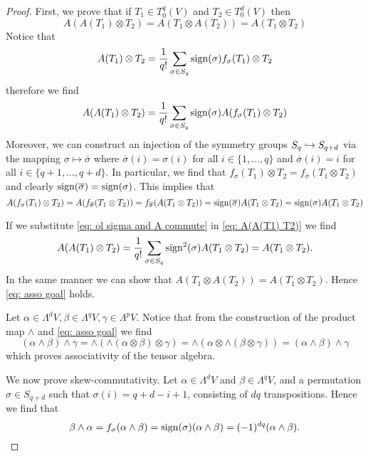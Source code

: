 \begin{proof}
  First, we prove that if \(T_1 \in T_0^q(V)\) and \(T_2 \in T_0^d(V)\) then
  \begin{equation}\label{eq: asso goal}
    A(A(T_1) \otimes T_2) = A(T_1 \otimes A(T_2)) =
    A(T_1 \otimes T_2)
  \end{equation} Notice that \[
    A(T_1) \otimes T_2 = \frac 1 {q!} \sum_{\sigma \in S_q}
    \operatorname{sign}(\sigma) f_\sigma(T_1) \otimes T_2
  \]
  therefore we find
  \begin{equation}\label{eq: A(A(T1) T2)}
    A(A(T_1) \otimes T_2) = \frac 1 {q!} \sum_{\sigma \in S_q}
    \operatorname{sign}(\sigma) A(f_\sigma(T_1) \otimes T_2)
  \end{equation}
  Moreover, we can construct an injection of the symmetry groups \(S_q
  \hookrightarrow S_{q + d}\) via the mapping \(\sigma \mapsto \overline \sigma\)
  where \(\overline \sigma(i) = \sigma(i)\) for all \(i \in \{1, \dots, q\}\)
  and \(\overline \sigma(i) = i\) for all \(i \in \{q + 1, \dots, q + d\}\). In
  particular, we find that \(f_\sigma(T_1) \otimes T_2 = f_{\overline \sigma}
  (T_1 \otimes T_2)\) and clearly \(\operatorname{sign}(\overline \sigma) = \operatorname{sign}(\sigma)\).
  This implies that
  \begin{equation}\label{eq: ol sigma and A commute}
    A(f_\sigma(T_1) \otimes T_2) = A(f_{\overline \sigma}(T_1 \otimes T_2))
    = f_{\overline \sigma}(A(T_1 \otimes T_2))
    = \operatorname{sign}(\overline \sigma) A(T_1 \otimes T_2)
    = \operatorname{sign}(\sigma) A(T_1 \otimes T_2)
  \end{equation}

  If we substitute \cref{eq: ol sigma and A commute} in \cref{eq: A(A(T1) T2)}
  we find
  \[
    A(A(T_1) \otimes T_2) = \frac 1 {q!} \sum_{\sigma \in S_q}
    \operatorname{sign}^2(\sigma) A(T_1 \otimes T_2) = A(T_1 \otimes T_2).
  \]
  In the same manner we can show that \(A(T_1 \otimes A(T_2)) = A(T_1 \otimes
  T_2)\). Hence \cref{eq: asso goal} holds.

  Let \(\alpha \in \Lambda^d V, \beta \in \Lambda^q V, \gamma \in \Lambda^p V\).
  Notice that from the construction of the product map \(\wedge\) and \cref{eq:
  asso goal} we find
  \[
    (\alpha \wedge \beta) \wedge \gamma
    = \wedge\left( \wedge(\alpha \otimes \beta) \otimes \gamma \right)
    = \wedge\left(\alpha \otimes \wedge(\beta \otimes \gamma) \right)
    = (\alpha \wedge \beta) \wedge \gamma
  \]
  which proves associativity of the tensor algebra.

  We now prove skew-commutativity. Let \(\alpha \in \Lambda^d V\) and \(\beta
  \in \Lambda^q V\), and a permutation \(\sigma \in S_{q + d}\) such
  that \(\sigma(i) = q + d - i + 1\), consisting of \(d q\) transpositions.
  Hence we find that
  \[
    \beta \wedge \alpha = f_\sigma(\alpha \wedge \beta)
    = \operatorname{sign}(\sigma)(\alpha \wedge \beta) = (-1)^{d q} (\alpha \wedge \beta).
  \]
\end{proof}

